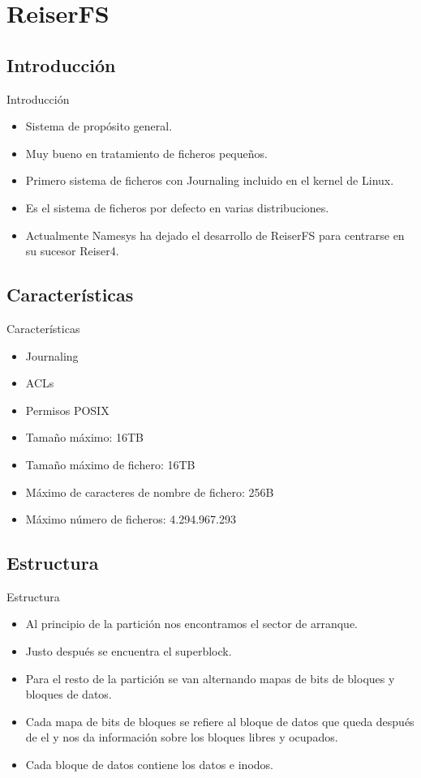 \section{ReiserFS}
\subsection{Introducción}
\begin{frame}{Introducción}
  \begin{itemize}
    \item Sistema de propósito general.
    \item Muy bueno en tratamiento de ficheros pequeños.
    \item Primero sistema de ficheros con Journaling incluido en el kernel de Linux.
    \item Es el sistema de ficheros por defecto en varias distribuciones.
    \item Actualmente Namesys ha dejado el desarrollo de ReiserFS para centrarse en su sucesor Reiser4.
  \end{itemize}
\end{frame}

\subsection{Características}
\begin{frame}{Características}
  \begin{itemize}
    \item Journaling
    \item ACLs
    \item Permisos POSIX
    \item Tamaño máximo: 16TB
    \item Tamaño máximo de fichero: 16TB
    \item Máximo de caracteres de nombre de fichero: 256B
    \item Máximo número de ficheros: 4.294.967.293
  \end{itemize}
\end{frame}

\subsection{Estructura}
\begin{frame}{Estructura}
  \begin{itemize}
    \item Al principio de la partición nos encontramos el sector de arranque.
    \item Justo después se encuentra el superblock.
    \item Para el resto de la partición se van alternando mapas de bits de bloques y bloques de datos.
    \item Cada mapa de bits de bloques se refiere al bloque de datos que queda después de el y nos da información sobre los bloques libres  y ocupados.
    \item Cada bloque de datos contiene los datos e inodos.
  \end{itemize}
\end{frame}

